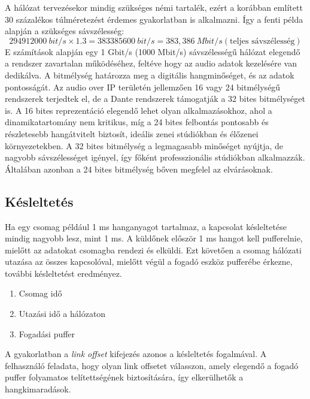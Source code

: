 A hálózat tervezésekor mindig szükséges némi tartalék, ezért a korábban említett
30 százalékos túlméretezést érdemes gyakorlatban is alkalmazni. Így a fenti
példa alapján a szükséges sávszélesség:
\begin{equation}
	\label{eq:teljes-sávszélesség}
	294912000\ bit/s \times 1.3 = 383385600\ bit/s = 383,386\ Mbit/s (\text{teljes sávszélesség})
\end{equation}
E számítások alapján egy 1 Gbit/s (1000 Mbit/s) sávszélességű hálózat elegendő
a rendszer zavartalan működéséhez, feltéve hogy az audio adatok kezelésére van
dedikálva. A bitmélység határozza meg a digitális hangminőséget, és az adatok
pontosságát. Az audio over IP területén jellemzően 16 vagy 24 bitmélységű rendszerek
terjedtek el, de a Dante rendszerek támogatják a 32 bites bitmélységet is. A 16
bites reprezentáció elegendő lehet olyan alkalmazásokhoz, ahol a dinamikatartomány
nem kritikus, míg a 24 bites felbontás pontosabb és részletesebb hangátvitelt
biztosít, ideális zenei stúdiókban és élőzenei környezetekben. A 32 bites
bitmélység a legmagasabb minőséget nyújtja, de nagyobb sávszélességet igényel,
így főként professzionális stúdiókban alkalmazzák. Általában azonban a 24
bites bitmélység bőven megfelel az elvárásoknak.

\subsection{Késleltetés}
Ha egy csomag például 1 ms hanganyagot tartalmaz, a kapcsolat késleltetése
mindig nagyobb lesz, mint 1 ms. A küldőnek először 1 ms hangot kell pufferelnie,
mielőtt az adatokat csomagba rendezi és elküldi. Ezt követően a csomag
hálózati utazása az összes kapcsolóval, mielőtt végül a fogadó eszköz pufferébe
érkezne, további késleltetést eredményez.

\begin{enumerate}
    \item Csomag idő
    \item Utazási idő a hálózaton
    \item Fogadási puffer
\end{enumerate}
A gyakorlatban a \textit{link offset} kifejezés azonos a késleltetés fogalmával.
A felhasználó feladata, hogy olyan link offsetet válasszon, amely elegendő
a fogadó puffer folyamatos telítettségének biztosítására, így elkerülhetők
a hangkimaradások.

